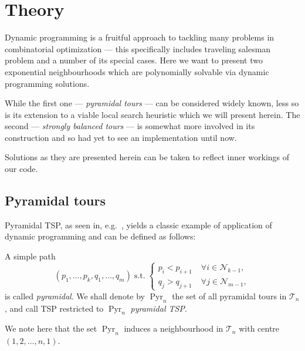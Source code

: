 \documentclass[titlepage,twoside,index=totoc,bibliography=totoc]{scrartcl}
\numberwithin{equation}{section}
\numberwithin{figure}{section}
\numberwithin{table}{section}
\let\defstyle\itshape
\begin{document}

\section{Theory}
\vspace{0.87em}

Dynamic programming is a fruitful approach to tackling many problems in
combinatorial optimization --- this specifically includes traveling
salesman problem and a number of its special cases.  Here we want to
present two exponential neighbourhoods which are polynomially solvable via
dynamic programming solutions.

While the first one --- {\defstyle pyramidal tours} --- can be considered
widely known, less so is its extension to a viable local search heuristic
which we will present herein.  The second --- {\defstyle strongly balanced
  tours} --- is somewhat more involved in its construction and so had yet
to see an implementation until now.

Solutions as they are presented herein can be taken to reflect inner
workings of our code.

\subsection{Pyramidal tours}

Pyramidal TSP, as seen in, e.g.\ \cite{burkard,gilmore}, yields a
classic example of application of dynamic programming and can be defined as
follows:

\begin{define}
  A simple path
  \[
  \left( p_1, \ldots, p_k, q_1, \ldots, q_m \right)
  \; \text{s.t.} \;
  \begin{cases}
    p_i < p_{i+1} \; & \forall i \in \mathcal{N}_{k-1},\\
    q_j > q_{j+1} \; & \forall j \in \mathcal{N}_{m-1},
  \end{cases}
  \]
  is called {\defstyle pyramidal}.  We shall denote by
  $\operatorname{Pyr}_n$ the set of all pyramidal tours in $\mathcal{T}_n$,
  and call TSP restricted to $\operatorname{Pyr}_n$ {\defstyle pyramidal TSP}.
\end{define}
We note here that the set $\operatorname{Pyr}_n$
induces a neighbourhood in $\mathcal{T}_n$ with centre
$\left(1, 2, \ldots, n, 1\right)$.
\end{document}
